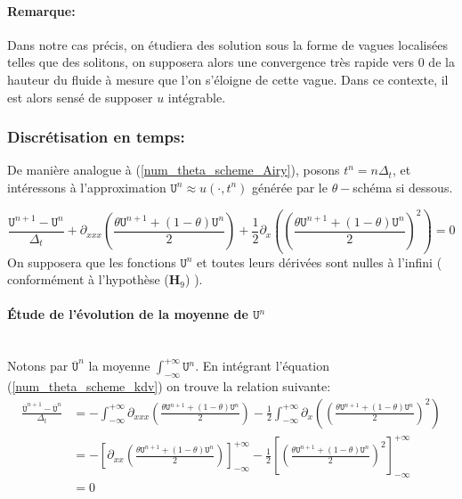\documentclass[12pt,a4paper]{article}
\numberwithin{equation}{section}
\begin{document}
\paragraph{Remarque: } Dans notre cas précis, on étudiera des solution sous la forme de vagues localisées telles que des solitons, on supposera alors une convergence très rapide vers 0 de la hauteur du fluide à mesure que l'on s'éloigne de cette vague. Dans ce contexte, il est alors sensé de supposer $u$ intégrable.

\subsubsection{ Discrétisation en temps: }

De manière analogue à (\ref{num_theta_scheme_Airy}), posons $t^n = n\Delta_t$, et intéressons à l'approximation $\texttt{U}^n \approx u(\cdot,t^n)$ générée par le $\theta-$schéma si dessous.

\begin{equation}
\frac{\texttt{U}^{n+1}-\texttt{U}^n}{\Delta_t} + \partial_{xxx}\left(\frac{\theta\texttt{U}^{n+1} + (1-\theta)\texttt{U}^{n}}{2}\right) + \frac{1}{2}\partial_{x}\left( \left(\frac{\theta\texttt{U}^{n+1} + (1-\theta)\texttt{U}^{n}}{2}\right)^2 \right) = 0 \label{num_theta_scheme_kdv}
\end{equation}
On supposera que les fonctions $\texttt{U}^n$ et toutes leurs dérivées sont nulles à l'infini ( conformément à l'hypothèse ($\textbf{H}_9$) ).
\paragraph{Étude de l'évolution de la moyenne de $\texttt{U}^n$}\,\\

Notons par $\overline{\texttt{U}}^n$ la moyenne $\int_{-\infty}^{+\infty}\texttt{U}^n$. En intégrant l'équation (\ref{num_theta_scheme_kdv}) on trouve la relation suivante:
\begin{equation*}
\begin{split}
    \frac{\overline{\texttt{U}}^{n+1}-\overline{\texttt{U}}^n}{\Delta_t} 
    &= -\int_{-\infty}^{+\infty} \partial_{xxx}\left(\frac{\theta\texttt{U}^{n+1} + (1-\theta)\texttt{U}^{n}}{2}\right) -\frac{1}{2}\int_{-\infty}^{+\infty} \partial_{x}\left( \left(\frac{\theta\texttt{U}^{n+1} + (1-\theta)\texttt{U}^{n}}{2}\right)^2 \right) \\
    &= - \left[ \partial_{xx}\left(\frac{\theta\texttt{U}^{n+1} + (1-\theta)\texttt{U}^{n}}{2}\right)\right]_{-\infty}^{+\infty} -\frac{1}{2}\left[\left(\frac{\theta\texttt{U}^{n+1} + (1-\theta)\texttt{U}^{n}}{2}\right)^2 \right]_{-\infty}^{+\infty} \\
    & = 0
\end{split}
\end{equation*}
\end{document}
